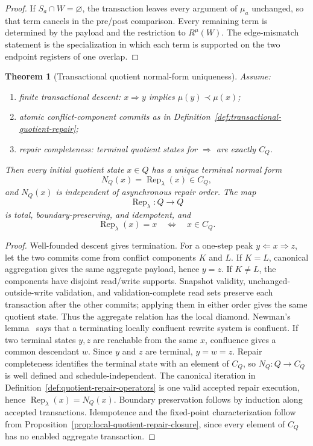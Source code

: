 \documentclass[11pt]{article}
\newtheorem{theorem}{Theorem}[section]
\begin{document}
\begin{proof}
If \(S_a\cap W=\varnothing\), the transaction leaves every argument of \(\mu_a\) unchanged, so that
term cancels in the pre/post comparison. Every remaining term is determined by the payload and the
restriction to \(R^\mu(W)\). The edge-mismatch statement is the specialization in which each term
is supported on the two endpoint registers of one overlap.
\end{proof}

\begin{theorem}[Transactional quotient normal-form uniqueness]\label{thm:confluence}
Assume:
\begin{enumerate}[label=\textup{(\roman*)},leftmargin=2em]
\item finite transactional descent: \(x\Rightarrow y\) implies \(\mu(y)\prec\mu(x)\);
\item atomic conflict-component commits as in Definition~\ref{def:transactional-quotient-repair};
\item repair completeness: terminal quotient states for \(\Rightarrow\) are exactly \(C_Q\).
\end{enumerate}
Then every initial quotient state \(x\in Q\) has a unique terminal normal form
\[
N_Q(x)=\operatorname{Rep}_\lambda(x)\in C_Q,
\]
and \(N_Q(x)\) is independent of asynchronous repair order.  The map
\[
\operatorname{Rep}_\lambda:Q\to Q
\]
is total, boundary-preserving, and idempotent, and
\[
\operatorname{Rep}_\lambda(x)=x
\quad\Longleftrightarrow\quad
x\in C_Q.
\]
\end{theorem}

\begin{proof}
Well-founded descent gives termination. For a one-step peak
\(y\Leftarrow x\Rightarrow z\), let the two commits come from conflict components \(K\) and \(L\).
If \(K=L\), canonical aggregation gives the same aggregate payload, hence \(y=z\). If \(K\ne L\),
the components have disjoint read/write supports. Snapshot validity, unchanged-outside-write
validation, and validation-complete read sets preserve each transaction after the other
commits; applying them in either order gives the same quotient state. Thus the aggregate relation
has the local diamond. Newman's lemma~\cite{newman42} says that a terminating locally confluent
rewrite system is confluent. If two terminal states \(y,z\) are reachable from the same \(x\),
confluence gives a common descendant \(w\). Since \(y\) and \(z\) are terminal, \(y=w=z\). Repair
completeness identifies the terminal state with an element of \(C_Q\), so \(N_Q:Q\to C_Q\) is
well defined and schedule-independent.  The canonical iteration in
Definition~\ref{def:quotient-repair-operators} is one valid accepted repair execution, hence
\(\operatorname{Rep}_\lambda(x)=N_Q(x)\).  Boundary preservation follows by induction along
accepted transactions.  Idempotence and the fixed-point characterization follow from
Proposition~\ref{prop:local-quotient-repair-closure}, since every element of \(C_Q\) has no enabled
aggregate transaction.
\end{proof}
\end{document}
